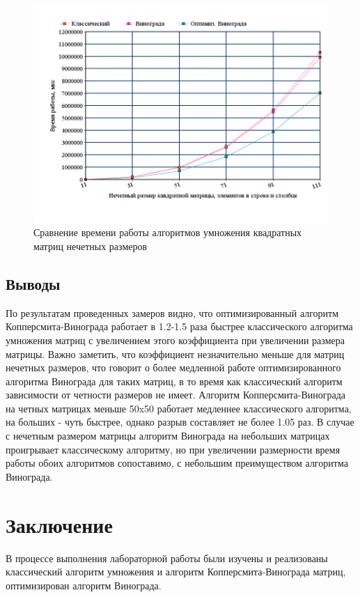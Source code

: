 \documentclass[a4paper,oneside,14pt]{extreport}
\begin{document}
\begin{figure}[H]
	\centering
	\includegraphics[width=1\linewidth]{images/even_mat}
	\caption{Сравнение времени работы алгоритмов умножения квадратных матриц нечетных размеров}
	\label{fig:even_graph}
\end{figure}

\section{Выводы}

По результатам проведенных замеров видно, что оптимизированный алгоритм Копперсмита-Винограда работает в 1.2-1.5 раза быстрее классического алгоритма умножения матриц с увеличением этого коэффициента при увеличении размера матрицы. Важно заметить, что коэффициент незначительно меньше для матриц нечетных размеров, что говорит о более медленной работе оптимизированного алгоритма Винограда для таких матриц, в то время как классический алгоритм зависимости от четности размеров не имеет. Алгоритм Копперсмита-Винограда на четных матрицах меньше 50x50 работает медленнее классического алгоритма, на больших - чуть быстрее, однако разрыв составляет не более 1.05 раз. В случае с нечетным размером матрицы алгоритм Винограда на небольших матрицах проигрывает классическому алгоритму, но при увеличении размерности время работы обоих алгоритмов сопоставимо, с небольшим преимуществом алгоритма Винограда.
\newpage

\chapter*{Заключение}
В процессе выполнения лабораторной работы были изучены и реализованы классический алгоритм умножения и алгоритм Копперсмита-Винограда матриц, оптимизирован алгоритм Винограда.
\end{document}
